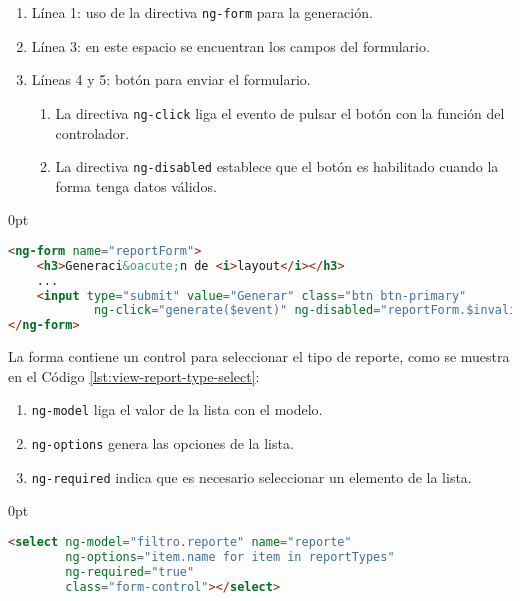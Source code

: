 \begin{enumerate}
\begin{enumerate}
	\item Línea 1: uso de la directiva \texttt{ng-form} para la generación.
	\item Línea 3: en este espacio se encuentran los campos del formulario.
	\item Líneas 4 y 5: botón para enviar el formulario.
	\begin{enumerate}
		\item La directiva \texttt{ng-click} liga el evento de pulsar el botón con la función del controlador.
		\item La directiva \texttt{ng-disabled} establece que el botón es habilitado cuando la forma tenga datos válidos.
	\end{enumerate}
\end{enumerate}

\begin{adjustwidth}{\listingfixwidth}{0pt}
\begin{lstlisting}[language=HTML, captionpos=b, caption={Forma de generación de reportes.}, label={lst:view-report-form}]
<ng-form name="reportForm">
	<h3>Generaci&oacute;n de <i>layout</i></h3>
	...
	<input type="submit" value="Generar" class="btn btn-primary"
			ng-click="generate($event)" ng-disabled="reportForm.$invalid"/>	
</ng-form>
\end{lstlisting}
\end{adjustwidth}

La forma contiene un control para seleccionar el tipo de reporte, como se muestra en el Código \ref{lst:view-report-type-select}:
\begin{enumerate}
	\item \texttt{ng-model} liga el valor de la lista con el modelo.
	\item \texttt{ng-options} genera las opciones de la lista.
	\item \texttt{ng-required} indica que es necesario seleccionar un elemento de la lista.
\end{enumerate}

\begin{adjustwidth}{\listingfixwidth}{0pt}
\begin{lstlisting}[language=HTML, captionpos=b, caption={Lista para seleccionar el tipo de reporte.}, label={lst:view-report-type-select}]
<select ng-model="filtro.reporte" name="reporte"
		ng-options="item.name for item in reportTypes"
		ng-required="true"
		class="form-control"></select>
\end{lstlisting}
\end{adjustwidth}


\end{enumerate}
